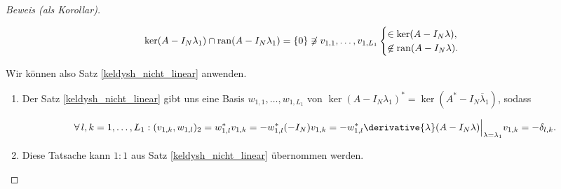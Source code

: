 \begin{proof}[Beweis (als Korollar)]
\begin{enumerate}[label = \arabic*.]
        \begin{align*}
            \ker (A - I_N \lambda_1) \cap \operatorname{ran} (A - I_N \lambda_1)
            =
            {\left \{ 0 \right \}}
            \not \ni
            v_{1, 1}, \dots, v_{1, L_1}
            \begin{cases}
                     \in \ker (A - I_N \lambda), \\
                \not \in \operatorname{ran} (A - I_N \lambda).
            \end{cases}
        \end{align*}
    
    \end{enumerate}

    Wir können also Satz \ref{keldysh_nicht_linear} anwenden.
    
    \begin{enumerate}[label = (\roman*), start = 2]

        \item Der Satz \ref{keldysh_nicht_linear} gibt uns eine Basis $w_{1, 1}, \dots, w_{1, L_1}$ von $\ker (A - I_N \lambda_1)^\ast = \ker (A^\ast - I_N \overline \lambda_1)$, sodass
        
        \begin{align*}
            \Forall l, k = 1, \dots, L_1:
                (v_{1, k}, w_{1, l})_2
                =
                w_{1, l}^\ast v_{1, k}
                =
                -w_{1, l}^\ast (-I_N) v_{1, k}
                =
                -w_{1, l}^\ast \derivative{\lambda}(A - I_N \lambda) \Big |_{\lambda = \lambda_1} v_{1, k}
                =
                -\delta_{l, k}.
        \end{align*}

        \item Diese Tatsache kann $1 : 1$ aus Satz \ref{keldysh_nicht_linear} übernommen werden.

    \end{enumerate}
    
\end{proof}
